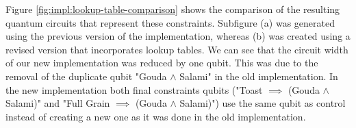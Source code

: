 Figure \ref{fig:impl:lookup-table-comparison} shows the comparison of the resulting quantum circuits that represent these constraints.
Subfigure (a) was generated using the previous version of the implementation, whereas (b) was created using a revised version that incorporates lookup tables.
We can see that the circuit width of our new implementation was reduced by one qubit.
This was due to the removal of the duplicate qubit "Gouda $\land$ Salami" in the old implementation.
In the new implementation both final constraints qubits ("Toast $\implies$ (Gouda $\land$ Salami)" and "Full Grain $\implies$ (Gouda $\land$ Salami)") use the same qubit as control instead of creating a new one as it was done in the old implementation. 

\begin{figure}
\end{figure}
